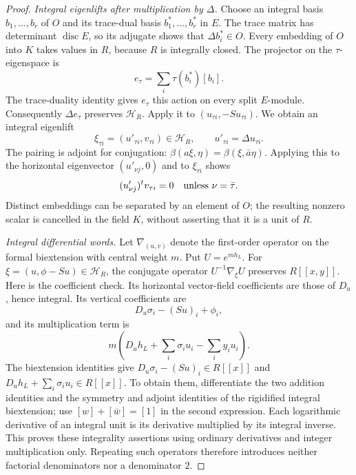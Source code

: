 \begin{proof}
\emph{Integral eigenlifts after multiplication by $\Delta$.}
Choose an integral basis $b_1,\ldots,b_r$ of $O$ and its trace-dual basis
$b_1^*,\ldots,b_r^*$ in $E$.  The trace matrix has determinant
$\operatorname{disc}E$, so its adjugate shows that $\Delta b_i^*\in O$.
Every embedding of $O$ into $K$ takes values in $R$, because $R$ is
integrally closed.  The projector on the $\tau$-eigenspace is
\[
 e_\tau=\sum_i\tau(b_i^*)[b_i].
\]
The trace-duality identity gives $e_\tau$ this action on every split
$E$-module.  Consequently $\Delta e_\tau$ preserves $\mathcal H_R$.
Apply it to $(u_{\tau i},-S u_{\tau i})$.  We obtain an integral eigenlift
\[
 \xi_{\tau i}=(u'_{\tau i},v_{\tau i})\in\mathcal H_R,
                  \qquad u'_{\tau i}=\Delta u_{\tau i}.
\]
The pairing is adjoint for conjugation:
$\beta(a\xi,\eta)=\beta(\xi,\bar a\eta)$.
Applying this to the horizontal eigenvector $(u'_{\nu j},0)$ and to
$\xi_{\tau i}$ shows
\begin{equation}\label{eq:discriminant-contraction-support}
          (u'_{\nu j})^t v_{\tau i}=0
                         \quad\hbox{unless $\nu=\bar\tau$.}
\end{equation}
Distinct embeddings can be separated by an element of $O$; the resulting
nonzero scalar is cancelled in the field $K$, without asserting that it
is a unit of $R$.

\emph{Integral differential words.}
Let $\nabla_{(u,v)}$ denote the first-order operator on the formal
biextension with central weight $m$.  Put $U=e^{m h_L}$.
For $\xi=(u,\phi-Su)\in\mathcal H_R$, the conjugate operator
$U^{-1}\nabla_\xi U$ preserves $R[[x,y]]$.
Here is the coefficient check.  Its horizontal vector-field coefficients
are those of $D_u$, hence integral.  Its vertical coefficients are
\[
             D_u\sigma_i-(Su)_i+\phi_i,
\]
and its multiplication term is
\[
        m\left(D_u h_L+\sum_i\sigma_i u_i-\sum_i y_i u_i\right).
\]
The biextension identities give
$D_u\sigma_i-(Su)_i\in R[[x]]$ and
$D_u h_L+\sum_i\sigma_i u_i\in R[[x]]$.
To obtain them, differentiate the two addition identities and the symmetry
and adjoint identities of the rigidified integral biextension; use
$[w]+[\bar w]=[1]$ in the second expression.  Each logarithmic derivative
of an integral unit is its derivative multiplied by its integral inverse.
This proves these integrality assertions using ordinary derivatives and
integer multiplication only.  Repeating such operators therefore
introduces neither factorial denominators nor a denominator $2$.


\end{proof}
